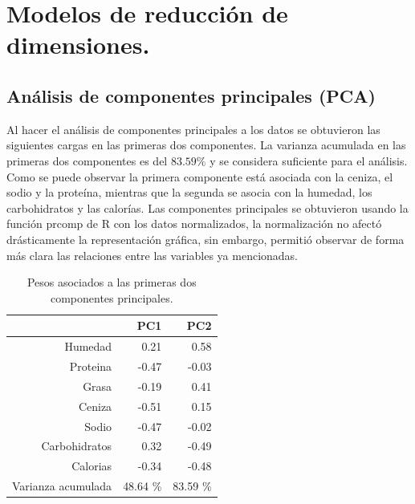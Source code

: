 \pagebreak
\restoregeometry 
\section{Modelos de reducción de dimensiones.}

\subsection{Análisis de componentes principales (PCA)}

Al hacer el análisis de componentes principales a los datos se obtuvieron las siguientes cargas en las primeras dos componentes. La varianza acumulada en las primeras dos componentes es del $83.59 \%$ y se considera suficiente para el análisis.
Como se puede observar la primera componente está asociada con la ceniza, el sodio y la proteína, mientras que la segunda se asocia con la humedad, los carbohidratos y las calorías.
Las componentes principales se obtuvieron usando la función \textsf{prcomp} de R con los datos normalizados, la normalización no afectó drásticamente la representación gráfica, sin embargo, permitió observar de forma más clara las relaciones entre las variables ya mencionadas.


\begin{table}[ht]
\centering
\begin{tabular}{rrr}
  \hline
 & PC1 & PC2 \\ 
  \hline
Humedad & 0.21 & 0.58 \\ 
  Proteina & -0.47 & -0.03 \\ 
  Grasa & -0.19 & 0.41 \\ 
  Ceniza & -0.51 & 0.15 \\ 
  Sodio & -0.47 & -0.02 \\ 
  Carbohidratos & 0.32 & -0.49 \\ 
  Calorias & -0.34 & -0.48 \\ 
  Varianza acumulada & 48.64 \% &  83.59 \% \\ 
\end{tabular}
	\label{tabla:pesos_PCA}
	\caption{Pesos asociados a las primeras dos componentes principales.}
\end{table}


